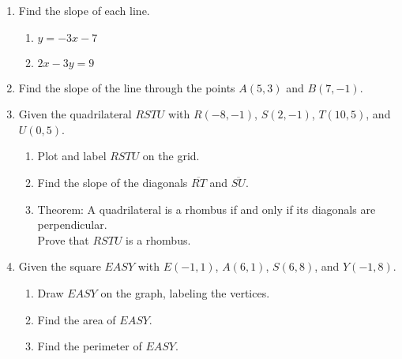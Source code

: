 \documentclass[12pt, oneside]{article}
\begin{document}
\begin{enumerate}
  \item Find the slope of each line.
  \begin{multicols}{2}
    \begin{enumerate}
      \item $y=-3x-7$
      \item $2x-3y=9$
    \end{enumerate}
  \end{multicols} \vspace{3cm}

  \item Find the slope of the line through the points $A(5,3)$ and $B(7,-1)$. \vspace{3cm}

\newpage

  \item Given the quadrilateral $RSTU$ with $R(-8,-1)$, $S(2,-1)$, $T(10,5)$, and $U(0,5)$.
  \begin{enumerate}
    \item Plot and label $RSTU$ on the grid.
    \item Find the slope of the diagonals $\overline{RT}$ and $\overline{SU}$.
    \item Theorem: A quadrilateral is a rhombus if and only if its diagonals are perpendicular.\\[0.5cm]
    Prove that $RSTU$ is a rhombus.
  \end{enumerate}

  \begin{center} %
  \end{center}

\newpage

  \item Given the square $EASY$ with $E(-1, 1)$, $A(6, 1)$, $S(6, 8)$, and $Y(-1, 8)$.
    \begin{enumerate}
      \item Draw $EASY$ on the graph, labeling the vertices.
      \item Find the area of $EASY$. \vspace{2cm}
      \item Find the perimeter of $EASY$. \vspace{2cm}
    \end{enumerate}


\end{enumerate}
\end{document}
